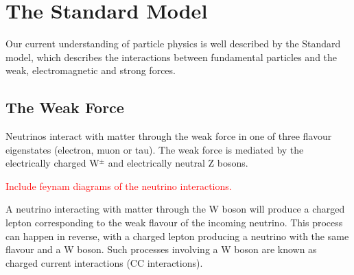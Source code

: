 
\section{The Standard Model}

Our current understanding of particle physics is well described by the Standard model, which describes the interactions between fundamental particles and the weak, electromagnetic and strong forces.



\subsection{The Weak Force}

Neutrinos interact with matter through the weak force in one of three flavour eigenstates (electron, muon or tau). The weak force is mediated by the electrically charged W$^{\pm}$ and electrically neutral Z bosons.

\textcolor{red}{Include feynam diagrams of the neutrino interactions.}

A neutrino interacting with matter through the W boson will produce a charged lepton corresponding to the weak flavour of the incoming neutrino. 
This process can happen in reverse, with a charged lepton producing a neutrino with the same flavour and a W boson. Such processes involving a W boson are known as charged current interactions (CC interactions).

